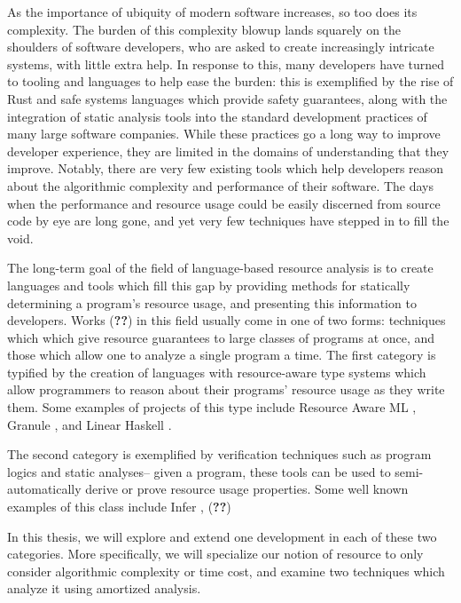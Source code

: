 As the importance of ubiquity of modern software increases, so too does its complexity. The burden of this complexity blowup lands squarely on the shoulders of software developers, who are asked to create increasingly intricate systems, with little extra help. In response to this, many developers have turned to tooling and languages to help ease the burden: this is exemplified by the rise of Rust and safe systems languages \citehere which provide safety guarantees, along with the integration of static analysis tools into the standard development practices of many large software companies. While these practices go a long way to improve developer experience, they are limited in the domains of understanding that they improve. Notably, there are very few existing tools which help developers reason about the algorithmic complexity and performance of their software. The days when the performance and resource usage could be easily discerned from source code by eye are long gone, and yet very few techniques have stepped in to fill the void.

The long-term goal of the field of language-based resource analysis is to create languages and tools which fill this gap by providing methods for statically determining a program's resource usage, and presenting this information to developers. Works (\textbf{??}) in this field usually come in one of two forms: techniques which which give resource guarantees to large classes of programs at once, and those which allow one to analyze a single program a time. The first category is typified by the creation of languages with resource-aware type systems which allow programmers to reason about their programs' resource usage as they write them. Some examples of projects of this type include Resource Aware ML \citehere, Granule \citehere, and Linear Haskell \citehere.

The second category is exemplified by verification techniques such as program logics and static analyses-- given a program, these tools can be used to semi-automatically derive or prove resource usage properties. Some well known examples of this class include Infer \citehere, (\textbf{??})

In this thesis, we will explore and extend one development in each of these two categories. More specifically, we will specialize our notion of resource to only consider algorithmic complexity or time cost, and examine two techniques which analyze it using amortized analysis.


\textbf{}

